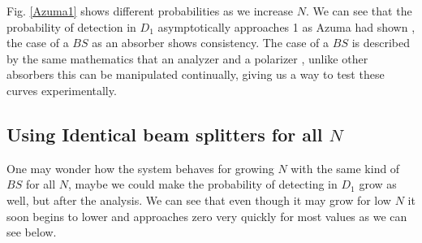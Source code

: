 \documentclass{book}
\begin{document}
Fig. \ref{Azuma1} shows different probabilities as we increase $N$. We can see that the probability of detection in $D_{1}$ asymptotically approaches 1 as Azuma had shown \cite{Azuma}, the case of a $BS$ as an absorber shows consistency. The case of a $BS$ is described by the same mathematics that an analyzer and a polarizer \cite{leonhardt}, unlike other absorbers this can be manipulated continually, giving us a way to test these curves experimentally.
 \subsection{Using Identical beam splitters for all $N$}
 
One may wonder how the system behaves for growing $N$ with the same kind of $BS$ for all $N$, maybe we could make the probability of detecting in $D_{1}$ grow as well, but after the analysis. We can see that even though it may grow for low $N$ it soon begins to lower and approaches zero very quickly for most values as we can see below.
\end{document}
